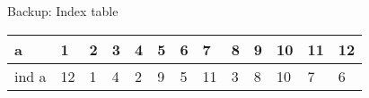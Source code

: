 Backup: Index table

\vspace{2mm}

\begin{tabular}{lllllllllllll}
    a     & 1  & 2 & 3 & 4 & 5 & 6 & 7  & 8 & 9 & 10 & 11 & 12 \\ \hline
    ind a & 12 & 1 & 4 & 2 & 9 & 5 & 11 & 3 & 8 & 10 & 7  & 6 
\end{tabular}

\vspace{2mm}





